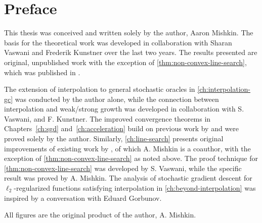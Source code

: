 
\chapter{Preface}

This thesis was conceived and written solely by the author, Aaron Mishkin. 
The basis for the theoretical work was developed in collaboration with Sharan Vaswani and Frederik Kunstner over the last two years.
The results presented are original, unpublished work with the exception of \autoref{thm:non-convex-line-search}, which was published in \citet{vaswani2019painless}.

The extension of interpolation to general stochastic oracles in \autoref{ch:interpolation-gc} was conducted by the author alone, while the connection between interpolation and weak/strong growth was developed in collaboration with S. Vaswani, and F. Kunstner. 
The improved convergence theorems in Chapters~\ref{ch:sgd} and~\ref{ch:acceleration} build on previous work by \citet{vaswani2019fast} and were proved solely by the author.  
Similarly, \autoref{ch:line-search} presents original improvements of existing work by \citet{vaswani2019painless}, of which A. Mishkin is a coauthor, with the exception of \autoref{thm:non-convex-line-search} as noted above.
The proof technique for \autoref{thm:non-convex-line-search} was developed by S. Vaswani, while the specific result was proved by A. Mishkin. 
The analysis of stochastic gradient descent for \( \ell_2 \)-regularized functions satisfying interpolation in \autoref{ch:beyond-interpolation} was inspired by a conversation with Eduard Gorbunov.

All figures are the original product of the author, A. Mishkin.

